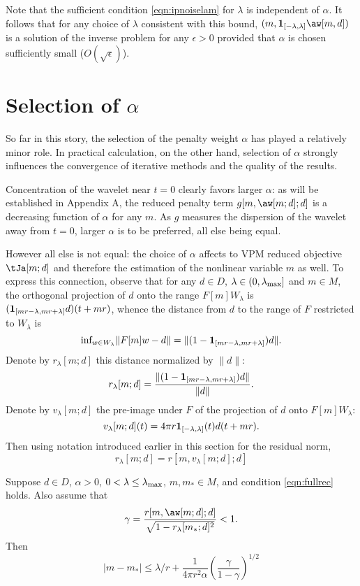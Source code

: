  Note that the sufficient condition \ref{eqn:ipnoiselam} for
$\lambda$ is independent of $\alpha$. It follows that for any choice
of $\lambda$ consistent with this bound, $(m,{\bf
  1}_{[-\lambda,\lambda]}\aw[m,d])$ is a solution of the inverse
problem for any $\epsilon > 0$ provided that $\alpha$ is chosen
sufficiently small ($O(\sqrt{\epsilon})$).

\section{Selection of $\alpha$}

So far in this story, the selection of the penalty weight $\alpha$ has played a relatively minor role. In practical calculation, on the other hand, selection of $\alpha$ strongly influences the convergence of iterative methods and the quality of the results. 

Concentration of the wavelet near $t=0$ clearly favors larger $\alpha$: as will be established in Appendix A, the reduced penalty term $g[m,\aw[m;d];d]$ is a decreasing function of $\alpha$ for any $m$. As $g$ measures the dispersion of the wavelet away from $t=0$, larger $\alpha$ is to be preferred, all else being equal. 

However all else is not equal: the choice of $\alpha$ affects to VPM reduced objective $\tJa[m;d]$ and therefore the estimation of the nonlinear variable $m$ as well. To express this connection, observe that for any $d \in D$, $\lambda \in (0,\lambda_{\rm max}]$ and $m \in M$, 
the orthogonal projection of $d$ onto the range $F[m]W_{\lambda}$ is
$({\bf 1}_{[mr-\lambda,mr+\lambda]}d)(t+mr)$, whence the distance from $d$ to the range of $F$ restricted to $W_{\lambda}$ is
\[
\mbox{inf}_{w \in W_{\lambda}} \|F[m]w-d\| = \|(1-{\bf 1}_{[mr-\lambda,mr+\lambda]})d\|.
\]
Denote by $r_{\lambda}[m;d]$ this distance normalized by $\|d\|$:
\[
r_{\lambda}[m;d] = \frac{ \|(1-{\bf 1}_{[mr-\lambda,mr+\lambda]})d\|}{\|d\|}.
\]
Denote by $v_{\lambda}[m;d]$ the pre-image under
$F$ of the projection of $d$ onto $F[m]W_{\lambda}$:
\[
v_{\lambda}[m;d](t) = 4\pi r {\bf 1}_{[-\lambda,\lambda]}(t)d(t+mr).
\]
Then using notation introduced earlier in this section for the residual norm,
\[
r_{\lambda}[m;d] = r[m,v_{\lambda}[m;d];d]
\]

\begin{theorem}
  \label{thm:malpha}
  Suppose $d \in D$, $\alpha>0$, $0<\lambda \le \lambda_{\rm max}$, $m,m_* \in M$, and condition \ref{eqn:fullrec} holds. Also assume that
  \begin{equation}
      \label{eqn:rcomp}
  \gamma = \frac{r[m,\aw[m;d];d]}{\sqrt{1-r_{\lambda}[m_*;d]^2}} < 1.
  \end{equation}
  Then
  \begin{equation}
      \label{eqn:mbnde}
      |m-m_*| \le \lambda/r + \frac{1}{4\pi r^2 \alpha}\left(\frac{\gamma}{1-\gamma}\right)^{1/2}
   \end{equation}
\end{theorem} 


